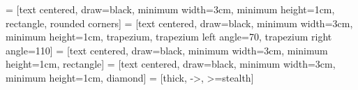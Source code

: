   = [text centered, draw=black, minimum width=3cm, minimum height=1cm, rectangle, rounded corners]
      = [text centered, draw=black, minimum width=3cm, minimum height=1cm, trapezium, trapezium left angle=70, trapezium right angle=110]
    = [text centered, draw=black, minimum width=3cm, minimum height=1cm, rectangle]
   = [text centered, draw=black, minimum width=3cm, minimum height=1cm, diamond]
      = [thick, ->, >=stealth]


\usepackage{pgfplots}
\pgfplotsset{compat=1.17}


\usepackage[exercisedelayed,answerdelayed]{exercise}

\def\shipoutexercises{\shipoutExercise}
\def\shipoutanswers{\shipoutAnswer}

\makeatletter{}\makeatother

\makeatletter{}\makeatother
